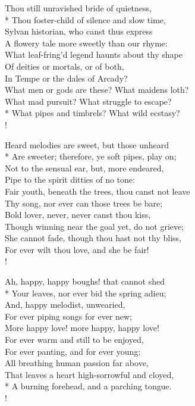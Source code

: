 Thou still unravished bride of quietness,\\*
\vin Thou foster-child of silence and slow time,\\
Sylvan historian, who canst thus express\\
\vin A flowery tale more sweetly than our rhyme:\\
What leaf-fring'd legend haunts about thy shape\\
\vin Of deities or mortals, or of both,\\
\vin \vin In {\sc Tempe} or the dales of {\sc Arcady}?\\
\vin What men or gods are these? What maidens loth?\\
What mad pursuit? What struggle to escape?\\*
\vin \vin What pipes and timbrels? What wild ecstasy?\\!

Heard melodies are sweet, but those unheard\\*
\vin Are sweeter; therefore, ye soft pipes, play on;\\
Not to the sensual ear, but, more endeared,\\
\vin Pipe to the spirit ditties of no tone:\\
Fair youth, beneath the trees, thou canst not leave\\
\vin Thy song, nor ever can those trees be bare;\\
\vin \vin Bold lover, never, never canst thou kiss,\\
Though winning near the goal yet, do not grieve;\\
\vin She cannot fade, though thou hast not thy bliss,\\
\vin \vin For ever wilt thou love, and she be fair!\\!

Ah, happy, happy boughs! that cannot shed\\*
\vin Your leaves, nor ever bid the spring adieu;\\
And, happy melodist, unwearied,\\
\vin For ever piping songs for ever new;\\
More happy love! more happy, happy love!\\
\vin For ever warm and still to be enjoyed,\\
\vin \vin For ever panting, and for ever young;\\
All breathing human passion far above,\\
\vin That leaves a heart high-sorrowful and cloyed,\\*
\vin \vin A burning forehead, and a parching tongue.\\!

